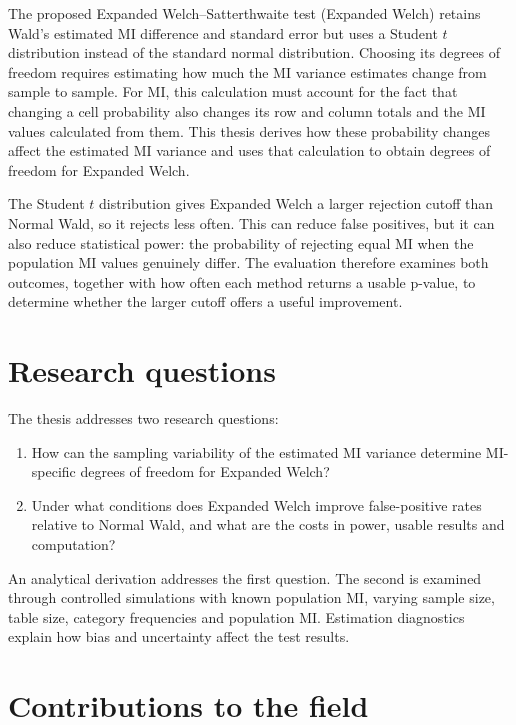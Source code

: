 The proposed Expanded Welch--Satterthwaite test (Expanded Welch) retains
Wald's estimated MI difference and standard error but uses a Student
\(t\) distribution instead of the standard normal distribution. Choosing
its degrees of freedom requires estimating how much the MI variance
estimates change from sample to sample. For MI, this calculation must
account for the fact that changing a cell probability also changes its
row and column totals and the MI values calculated from them. This thesis
derives how these probability changes affect the estimated MI variance
and uses that calculation to obtain degrees of freedom for Expanded Welch.

The Student \(t\) distribution gives Expanded Welch a larger rejection
cutoff than Normal Wald, so it rejects less often. This can reduce false
positives, but it can also reduce statistical power: the probability of
rejecting equal MI when the population MI values genuinely differ.
The evaluation therefore examines both outcomes, together
with how often each method returns a usable p-value, to determine whether
the larger cutoff offers a useful improvement.

\section{Research questions}

The thesis addresses two research questions:
\begin{enumerate}
  \item How can the sampling variability of the estimated MI variance
  determine MI-specific degrees of freedom for Expanded Welch?
  \item Under what conditions does Expanded Welch improve false-positive
  rates relative to Normal Wald, and what are the costs in power,
  usable results and computation?
\end{enumerate}

An analytical derivation addresses the first question. The second is
examined through controlled simulations with known population MI, varying
sample size, table size, category frequencies and population MI.
Estimation diagnostics explain how bias and uncertainty affect the test
results.

\section{Contributions to the field}

